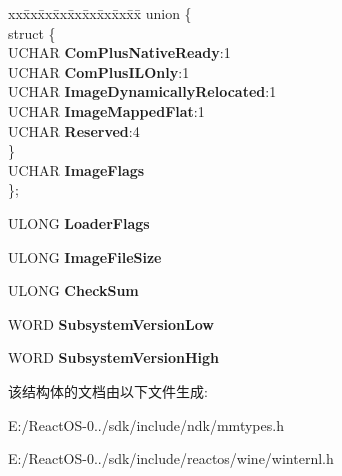\begin{DoxyCompactItemize}
\begin{tabbing}
xx\=xx\=xx\=xx\=xx\=xx\=xx\=xx\=xx\=\kill
union \{\\
\mbox{\label{union___s_e_c_t_i_o_n___i_m_a_g_e___i_n_f_o_r_m_a_t_i_o_n_1_1_0D2155_a16596dc2af5716de0be2a9bfdd1333c8}} 
\>struct \{\\
\>\>UCHAR {\bfseries ComPlusNativeReady}:1\\
\>\>UCHAR {\bfseries ComPlusILOnly}:1\\
\>\>UCHAR {\bfseries ImageDynamicallyRelocated}:1\\
\>\>UCHAR {\bfseries ImageMappedFlat}:1\\
\>\>UCHAR {\bfseries Reserved}:4\\
\>\} \\
\>UCHAR {\bfseries ImageFlags}\\
\}; \\

\end{tabbing}\item 
\mbox{\label{struct___s_e_c_t_i_o_n___i_m_a_g_e___i_n_f_o_r_m_a_t_i_o_n_abcd410976c885df6a1f9ec53976b76f1}} 
U\+L\+O\+NG {\bfseries Loader\+Flags}
\item 
\mbox{\label{struct___s_e_c_t_i_o_n___i_m_a_g_e___i_n_f_o_r_m_a_t_i_o_n_af8f56f46276150515f874874767e3dc5}} 
U\+L\+O\+NG {\bfseries Image\+File\+Size}
\item 
\mbox{\label{struct___s_e_c_t_i_o_n___i_m_a_g_e___i_n_f_o_r_m_a_t_i_o_n_a3994a46d081e7b85a9b75afd7d04db09}} 
U\+L\+O\+NG {\bfseries Check\+Sum}
\item 
\mbox{\label{struct___s_e_c_t_i_o_n___i_m_a_g_e___i_n_f_o_r_m_a_t_i_o_n_a9c755031e2828c9d9f19aa7c6b95a8fd}} 
W\+O\+RD {\bfseries Subsystem\+Version\+Low}
\item 
\mbox{\label{struct___s_e_c_t_i_o_n___i_m_a_g_e___i_n_f_o_r_m_a_t_i_o_n_ab5ded38e5a33a341fdb7c7dd583bdffd}} 
W\+O\+RD {\bfseries Subsystem\+Version\+High}
\end{DoxyCompactItemize}


该结构体的文档由以下文件生成\+:\begin{DoxyCompactItemize}
\item 
E\+:/\+React\+O\+S-\/0../sdk/include/ndk/mmtypes.\+h\item 
E\+:/\+React\+O\+S-\/0../sdk/include/reactos/wine/winternl.\+h\end{DoxyCompactItemize}
